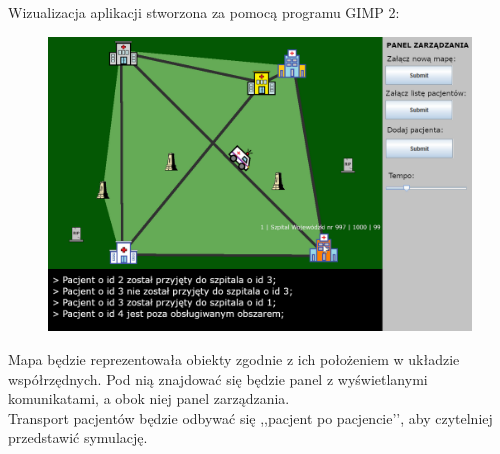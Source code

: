 \documentclass{article}
\begin{document}
{    \clearpage
    Wizualizacja aplikacji stworzona za pomocą programu GIMP 2:
    \begin{figure} [hbt!]
        \centering
        \includegraphics[width=13cm]{images/mapa_panele.png}
    \end{figure}
    
Mapa będzie reprezentowała obiekty zgodnie z ich położeniem w układzie współrzędnych. 
Pod nią znajdować się będzie panel z wyświetlanymi komunikatami, a obok niej panel zarządzania. \\

Transport pacjentów będzie odbywać się ,,pacjent po pacjencie’’, aby czytelniej przedstawić symulację.
}

\clearpage

\end{document}
